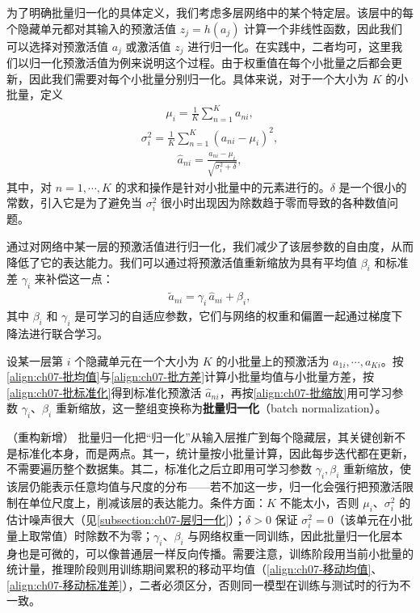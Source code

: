\documentclass[../../main.tex]{subfiles}
\begin{document}
为了明确批量归一化的具体定义，我们考虑多层网络中的某个特定层。该层中的每个隐藏单元都对其输入的预激活值 $z_j=h(a_j)$ 计算一个非线性函数，因此我们可以选择对预激活值 $a_j$ 或激活值 $z_j$ 进行归一化。在实践中，二者均可，这里我们以归一化预激活值为例来说明这个过程。由于权重值在每个小批量之后都会更新，因此我们需要对每个小批量分别归一化。具体来说，对于一个大小为 $K$ 的小批量，定义
\begin{align}
\mu_i = \frac{1}{K}\sum_{n=1}^{K}a_{ni},
\label{align:ch07-批均值}
\end{align}
\begin{align}
\sigma_i^{2} = \frac{1}{K}\sum_{n=1}^{K}(a_{ni}-\mu_i)^{2},
\label{align:ch07-批方差}
\end{align}
\begin{align}
\hat{a}_{ni} = \frac{a_{ni}-\mu_i}{\sqrt{\sigma_i^{2}+\delta}},
\label{align:ch07-批标准化}
\end{align}
其中，对 $n=1,\cdots,K$ 的求和操作是针对小批量中的元素进行的。$\delta$ 是一个很小的常数，引入它是为了避免当 $\sigma_i^{2}$ 很小时出现因为除数趋于零而导致的各种数值问题。

通过对网络中某一层的预激活值进行归一化，我们减少了该层参数的自由度，从而降低了它的表达能力。我们可以通过将预激活值重新缩放为具有平均值 $\beta_i$ 和标准差 $\gamma_i$ 来补偿这一点：
\begin{align}
\tilde{a}_{ni} = \gamma_i\,\hat{a}_{ni}+\beta_i,
\label{align:ch07-批缩放}
\end{align}
其中 $\beta_i$ 和 $\gamma_i$ 是可学习的自适应参数，它们与网络的权重和偏置一起通过梯度下降法进行联合学习。

\begin{definition}[批量归一化]\label{definition:ch07-批量归一化}
设某一层第 $i$ 个隐藏单元在一个大小为 $K$ 的小批量上的预激活为 $a_{1i},\cdots,a_{Ki}$。按\eqref{align:ch07-批均值}与\eqref{align:ch07-批方差}计算小批量均值与小批量方差，按\eqref{align:ch07-批标准化}得到标准化预激活 $\hat{a}_{ni}$，再按\eqref{align:ch07-批缩放}用可学习参数 $\gamma_i$、$\beta_i$ 重新缩放，这一整组变换称为\textbf{批量归一化}（batch normalization）。
\end{definition}

\begin{remark}（重构新增）
批量归一化把“归一化”从输入层推广到每个隐藏层，其关键创新不是标准化本身，而是两点。其一，统计量按小批量计算，因此每步迭代都在更新，不需要遍历整个数据集。其二，标准化之后立即用可学习参数 $\gamma_i,\beta_i$ 重新缩放，使该层仍能表示任意均值与尺度的分布——若不加这一步，归一化会强行把预激活限制在单位尺度上，削减该层的表达能力。条件方面：$K$ 不能太小，否则 $\mu_i$、$\sigma_i^{2}$ 的估计噪声很大（见\cref{subsection:ch07-层归一化}）；$\delta>0$ 保证 $\sigma_i^{2}=0$（该单元在小批量上取常值）时除数不为零；$\gamma_i$、$\beta_i$ 与网络权重一同训练，因此批量归一化层本身也是可微的，可以像普通层一样反向传播。需要注意，训练阶段用当前小批量的统计量，推理阶段则用训练期间累积的移动平均值（\eqref{align:ch07-移动均值}、\eqref{align:ch07-移动标准差}），二者必须区分，否则同一模型在训练与测试时的行为不一致。
\end{remark}
\end{document}
